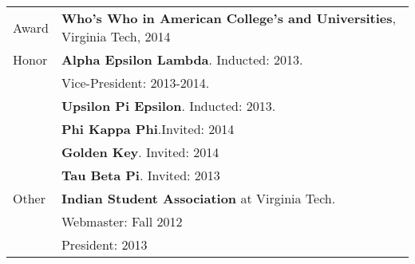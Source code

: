 
\begin{longtable}{p{0.5in}|p{6.5in}}
  Award & {\bf Who's Who in American College's and Universities}, Virginia Tech, 2014 \\
  Honor & {\bf Alpha Epsilon Lambda}. Inducted: 2013.  \\
        & \quad Vice-President: 2013-2014. \\
        & {\bf Upsilon Pi Epsilon}. Inducted: 2013.  \\
        & {\bf Phi Kappa Phi}.Invited: 2014\\
        & {\bf Golden Key}. Invited: 2014\\
        & {\bf Tau Beta Pi}. Invited: 2013\\
  Other & {\bf Indian Student Association} at Virginia Tech. \\
        & \quad Webmaster: Fall 2012 \\
        & \quad President: 2013\\
\end{longtable}

